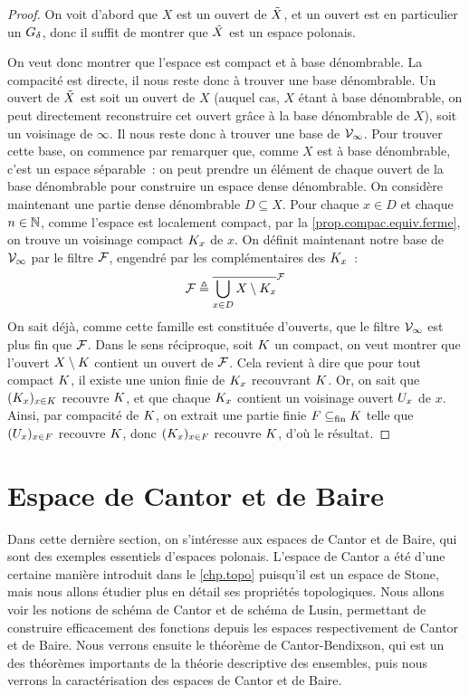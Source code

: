 \begin{proof}
  On voit d'abord que $X$ est un ouvert de $\tilde{X}$, et un ouvert est en
  particulier un $G_{\delta}$, donc il suffit de montrer que $\tilde{X}$ est un
  espace polonais.

  On veut donc montrer que l'espace est compact et à base dénombrable. La
  compacité est directe, il nous reste donc à trouver une base dénombrable. Un
  ouvert de $\tilde{X}$ est soit un ouvert de $X$ (auquel cas, $X$ étant à base
  dénombrable, on peut directement reconstruire cet ouvert grâce à la base
  dénombrable de $X$), soit un voisinage de $\infty$. Il nous reste donc à
  trouver une base de $\mathcal{V}_{\infty}$. Pour trouver cette base, on commence par
  remarquer que, comme $X$ est à base dénombrable, c'est un espace séparable~:
  on peut prendre un élément de chaque ouvert de la base dénombrable pour
  construire un espace dense dénombrable. On considère maintenant une partie
  dense dénombrable $D \subseteq X$. Pour chaque $x \in D$ et chaque
  $n \in \mathbb N$, comme l'espace est localement compact, par la
  \cref{prop.compac.equiv.ferme}, on trouve un voisinage compact $K_x$ de
  $x$. On définit maintenant notre base de $\mathcal{V}_{\infty}$ par le filtre
  $\mathcal{F}$, engendré par les complémentaires des $K_x$~:
  \[\mathcal{F} \triangleq \overline{\bigcup_{x \in D} X\setminus K_{x}}^{\mathcal{F}}\]
  On sait déjà, comme cette famille est constituée d'ouverts, que le filtre
  $\mathcal{V}_{\infty}$ est plus fin que $\mathcal{F}$. Dans le sens réciproque, soit
  $K$ un compact, on veut montrer que l'ouvert $X\setminus K$ contient
  un ouvert de $\mathcal{F}$. Cela revient à dire que pour tout compact $K$, il
  existe une union finie de $K_x$ recouvrant $K$. Or, on sait que
  $(K_x)_{x \in K}$ recouvre $K$, et que chaque $K_x$ contient
  un voisinage ouvert $U_x$ de $x$. Ainsi, par compacité de $K$, on
  extrait une partie finie $F\subseteq_{\mathrm{fin}} K$ telle que $(U_x)_{x \in F}$
  recouvre $K$, donc $(K_x)_{x \in F}$ recouvre $K$, d'où le
  résultat.
\end{proof}

\section{Espace de Cantor et de Baire}

Dans cette dernière section, on s'intéresse aux espaces de Cantor et de Baire,
qui sont des exemples essentiels d'espaces polonais. L'espace de Cantor a été
d'une certaine manière introduit dans le \cref{chp.topo} puisqu'il est un espace
de Stone, mais nous allons étudier plus en détail ses propriétés topologiques.
Nous allons voir les notions de schéma de Cantor et de schéma de Lusin,
permettant de construire efficacement des fonctions depuis les espaces
respectivement de Cantor et de Baire. Nous verrons ensuite le théorème de
Cantor-Bendixson, qui est un des théorèmes importants de la théorie descriptive
des ensembles, puis nous verrons la caractérisation des espaces de Cantor et de
Baire.

